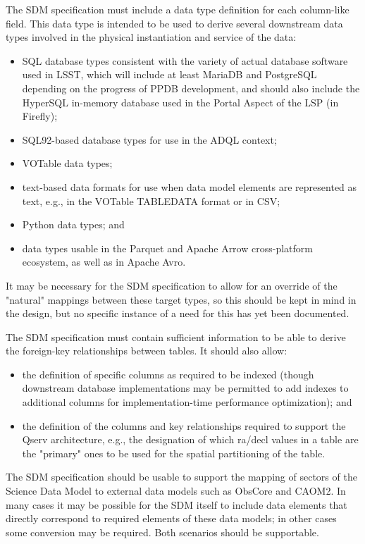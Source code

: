 The SDM specification must include a data type definition for each column-like field.  This data type is intended to be used to derive several downstream data types involved in the physical instantiation and service of the data:

\begin{itemize}
\item     SQL database types consistent with the variety of actual database software used in LSST, which will include at least MariaDB and PostgreSQL depending on the progress of PPDB development, and should also include the HyperSQL in-memory database used in the Portal Aspect of the LSP (in Firefly);
    \item SQL92-based database types for use in the ADQL context;
    \item VOTable data types;
    \item text-based data formats for use when data model elements are represented as text, e.g., in the VOTable TABLEDATA format or in CSV;
    \item Python data types; and
    \item data types usable in the Parquet and Apache Arrow cross-platform ecosystem, as well as in Apache Avro.
\end{itemize}

It may be necessary for the SDM specification to allow for an override of the "natural" mappings between these target types, so this should be kept in mind in the design, but no specific instance of a need for this has yet been documented.


The SDM specification must contain sufficient information to be able to derive the foreign-key relationships between tables.  It should also allow:
\begin{itemize}
\item the definition of specific columns as required to be indexed (though downstream database implementations may be permitted to add indexes to additional columns for implementation-time performance optimization); and
    \item the definition of the columns and key relationships required to support the Qserv architecture, e.g., the designation of which ra/decl values in a table are the "primary" ones to be used for the spatial partitioning of the table.
\end{itemize}

The SDM specification should be usable to support the mapping of sectors of the Science Data Model to external data models such as ObsCore and CAOM2.  In many cases it may be possible for the SDM itself to include data elements that directly correspond to required elements of these data models; in other cases some conversion may be required.  Both scenarios should be supportable.

